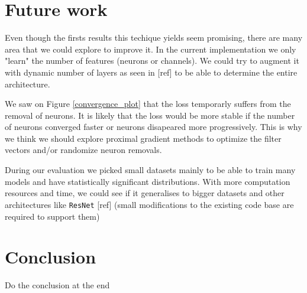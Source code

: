 \documentclass[sigconf]{acmart}
\begin{document}
\section{Future work}

\par Even though the firsts results this techique yields seem promising, there are many area that we could explore to improve it. In the current implementation we only "learn" the number of features (neurons or channels). We could try to augment it with dynamic number of layers as seen in [ref] to be able to determine the entire architecture.
\par We saw on Figure \ref{convergence_plot} that the loss temporarly suffers from the removal of neurons. It is likely that the loss would be more stable if the number of neurons converged faster or neurons disapeared more progressively. This is why we think we should explore proximal gradient methods to optimize the filter vectors and/or randomize neuron removals.
\par During our evaluation we picked small datasets mainly to be able to train many models and have statistically significant distributions. With more computation resources and time, we could see if it generalises to bigger datasets and other architectures like \texttt{ResNet} [ref] (small modifications to the existing code base are required to support them)

\section{Conclusion}
Do the conclusion at the end



\end{document}
